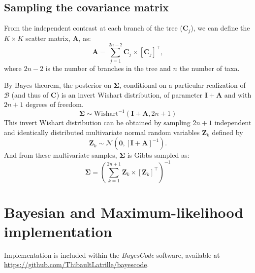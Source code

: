 \documentclass{article}
\newcommand{\MultiplyMatrix}{\times}
\newcommand{\UniDimArray}[1]{\bm{#1}}
\newcommand{\BiDimArray}[1]{\bm{#1}}
\newcommand{\tr}{^{\intercal}}
\newcommand{\inv}{^{-1}}
\newcommand{\NbrTaxa}{n}
\newcommand{\VecZero}{\UniDimArray{0}}
\newcommand{\Nbranch}{2 \NbrTaxa - 2}
\newcommand{\WishartPostDf}{2 \NbrTaxa + 1}
\newcommand{\Ntrait}{K}
\newcommand{\contrast}{\UniDimArray{C}}
\newcommand{\Covariancematrix}{\Sigma}
\newcommand{\CovarianceMatrix}{\BiDimArray{\Covariancematrix}}
\newcommand{\Identitymatrix}{\BiDimArray{I}}
\newcommand{\brownian}{\mathcal{B}}
\newcommand{\Brownian}{\UniDimArray{\brownian}}
\newcommand{\Scattermatrix}{\BiDimArray{A}}
\newcommand{\Multivariate}{\UniDimArray{Z}}
\begin{document}
\subsection{Sampling the covariance matrix}\label{subsec:sampling-the-covariance-matrix}
From the independent contrast at each branch of the tree ($\contrast_{j}$), we can define the $\Ntrait \times \Ntrait$ scatter matrix, $\Scattermatrix$, as:
\begin{equation}
    \Scattermatrix = \sum\limits_{j=1}^{\Nbranch} \contrast_{j} \MultiplyMatrix \left[\contrast_{j}\right]\tr\label{eq:bayes-scatter},
\end{equation}
where $\Nbranch$ is the number of branches in the tree and $\NbrTaxa$ the number of taxa.

By Bayes theorem, the {posterior} on $\CovarianceMatrix$, conditional on a particular realization of $\Brownian$ (and thus of $\contrast$) is an invert Wishart distribution, of parameter $\Identitymatrix + \Scattermatrix$ and with $\WishartPostDf$ degrees of freedom.
\begin{equation}
    \CovarianceMatrix \sim \text{Wishart}^{-1}\left( \Identitymatrix + \Scattermatrix, \WishartPostDf\right)\label{eq:bayes-posterior}
\end{equation}
This invert Wishart distribution can be obtained by sampling $\WishartPostDf$ independent and identically distributed multivariate normal random variables $\Multivariate_{k}$ defined by
\begin{equation}
    \Multivariate_{k} \sim \mathcal{N} \left( \VecZero, \left[ \Identitymatrix + \Scattermatrix\right]^{-1} \right).\label{eq:bayes-multivariate}
\end{equation}
And from these multivariate samples, $\CovarianceMatrix$ is Gibbs sampled as:
\begin{equation}
    \CovarianceMatrix = \left( \sum\limits_{k=1}^{\WishartPostDf} \Multivariate_{k} \MultiplyMatrix  \left[\Multivariate_{k} \right] \tr \right)\inv \label{eq:bayes-gibbs}
\end{equation}

\newpage
\section{Bayesian and Maximum-likelihood implementation}\label{sec:implementation}

Implementation is included within the \textit{BayesCode} software, available at \url{https://github.com/ThibaultLatrille/bayescode}.
\end{document}
